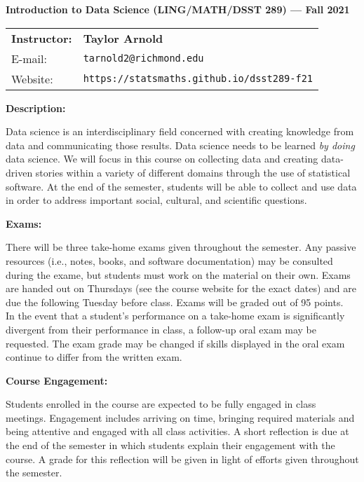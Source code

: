 \documentclass[11pt, a4paper]{article}
\begin{document}
\begin{center}
\textbf{Introduction to Data Science (LING/MATH/DSST 289) --- Fall 2021}
\end{center}

\noindent
\begin{tabular}{ l l }
\textbf{Instructor:} &  \textbf{Taylor Arnold} \\
E-mail: & \texttt{tarnold2@richmond.edu} \\
Website: & \texttt{https://statsmaths.github.io/dsst289-f21}
\end{tabular}

\vspace{0.5cm}

\textbf{Description:} \vspace{6pt}

Data science is an interdisciplinary field concerned with creating knowledge
from data and communicating those results. Data science needs to be learned
\textit{by doing} data science. We will focus in this course on collecting data
and creating data-driven stories within a variety of different domains through
the use of statistical software. At the end of the semester, students will be
able to collect and use data in order to address important social, cultural,
and scientific questions.

\bigskip

\textbf{Exams:} \vspace{6pt}

There will be three take-home exams given throughout the semester. Any passive
resources (i.e., notes, books, and software documentation) may be consulted
during the exame, but students must work on the material on their own. Exams
are handed out on Thursdays (see the course website for the exact dates) and
are due the following Tuesday before class. Exams will be graded out of 95
points.\\

In the event that a student's performance on a take-home exam is significantly
divergent from their performance in class, a follow-up oral exam may be
requested. The exam grade may be changed if skills displayed in the oral exam
continue to differ from the written exam.

\bigskip

\textbf{Course Engagement:} \vspace{6pt}

Students enrolled in the course are expected to be fully engaged in
class meetings. Engagement includes arriving on time, bringing required
materials and being attentive and engaged with all class activities. A short
reflection is due at the end of the semester in which students explain their
engagement with the course. A grade for this reflection will be given in light
of efforts given throughout the semester.
\end{document}
